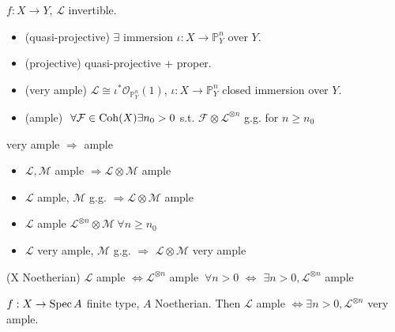 $f : X \to Y$, $\mathcal{L} $ invertible.

\begin{definition}
\begin{itemize}[topsep=-6pt, itemsep=0pt]
    \item (quasi-projective) $\exists$ immersion $ \iota : X \to \mathbb{P}^n_Y$ over $Y$.
    \item (projective) quasi-projective + proper.
    \item (very ample) $\mathcal{L} \cong \iota^* \mathcal{O}_{\mathbb{P}^n_Y}(1)$, $\iota : X \to \mathbb{P}^n_Y$ closed immersion over $Y$.
    \item (ample) $\ \forall  \mathcal{F} \in \operatorname{Coh}(X) \exists n_0 > 0$ s.t. $\mathcal{F} \otimes \mathcal{L}^{ \otimes n}  $ g.g. for $n \geq n_0$
\end{itemize}
\end{definition}

\begin{proposition}
very ample $ \Rightarrow $ ample
\end{proposition}

\begin{proposition}
\begin{itemize}[topsep=-6pt, itemsep=0pt]
    \item $\mathcal{L}, \mathcal{M}  $ ample $ \Rightarrow \mathcal{L} \otimes \mathcal{M} $ ample
    \item $\mathcal{L} $ ample, $\mathcal{M} $ g.g. $ \Rightarrow \mathcal{L} \otimes \mathcal{M}$ ample
    \item $\mathcal{L}$ ample $\mathcal{L}^{ \otimes n} \otimes \mathcal{M} \ \forall  n \geq  n_0$
    \item $\mathcal{L} $ very ample, $\mathcal{M} $ g.g. $ \Rightarrow $ $\mathcal{L} \otimes \mathcal{M}$ very ample
\end{itemize}
\end{proposition}

\begin{proposition} (X Noetherian) $\mathcal{L} $ ample
$ \Leftrightarrow  \mathcal{L}^{ \otimes n } $ ample $\ \forall  n > 0 $
$ \Leftrightarrow $ $\exists n > 0, \mathcal{L}^{ \otimes n } $ ample
\end{proposition}

\begin{proposition} $f : X \to \operatorname{Spec} A $ finite type, $A$ Noetherian. Then $\mathcal{L} $ ample $ \Leftrightarrow \exists n >0, \mathcal{L}^{ \otimes n} $ very ample.
\end{proposition}

